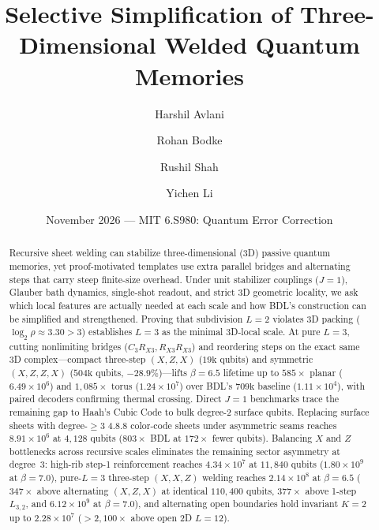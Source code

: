 \documentclass[aps,prx,reprint,superscriptaddress,nofootinbib,floatfix]{revtex4-2}
\begin{document}
\title{Selective Simplification of Three-Dimensional Welded Quantum Memories}

\author{Harshil Avlani}
\author{Rohan Bodke}
\author{Rushil Shah}
\author{Yichen Li}

\date{November 2026 --- MIT 6.S980: Quantum Error Correction}

\begin{abstract}
Recursive sheet welding can stabilize three-dimensional (3D) passive quantum memories, yet proof-motivated templates use extra parallel bridges and alternating steps that carry steep finite-size overhead. Under unit stabilizer couplings ($J = 1$), Glauber bath dynamics, single-shot readout, and strict 3D geometric locality, we ask which local features are actually needed at each scale and how BDL's construction can be simplified and strengthened. Proving that subdivision $L = 2$ violates 3D packing ($\log_2 \rho \approx 3.30 > 3$) establishes $L = 3$ as the minimal 3D-local scale. At pure $L = 3$, cutting nonlimiting bridges ($C_3 R_{X3}, R_{X3} R_{X3}$) and reordering steps on the exact same 3D complex---compact three-step $(X, Z, X)$ ($19\mathrm{k}$ qubits) and symmetric $(X, Z, Z, X)$ ($504\mathrm{k}$ qubits, $-28.9\%$)---lifts $\beta = 6.5$ lifetime up to $585\times$ planar ($6.49 \times 10^6$) and $1{,}085\times$ torus ($1.24 \times 10^7$) over BDL's $709\mathrm{k}$ baseline ($1.11 \times 10^4$), with paired decoders confirming thermal crossing. Direct $J = 1$ benchmarks trace the remaining gap to Haah's Cubic Code to bulk degree-$2$ surface qubits. Replacing surface sheets with degree-$\ge 3$ 4.8.8 color-code sheets under asymmetric seams reaches $8.91 \times 10^6$ at $4{,}128$ qubits ($803\times$ BDL at $172\times$ fewer qubits). Balancing $X$ and $Z$ bottlenecks across recursive scales eliminates the remaining sector asymmetry at degree~$3$: high-rib step-1 reinforcement reaches $4.34 \times 10^7$ at $11{,}840$ qubits ($1.80 \times 10^9$ at $\beta = 7.0$), pure-$L = 3$ three-step $(X, X, Z)$ welding reaches $2.14 \times 10^8$ at $\beta = 6.5$ ($347\times$ above alternating $(X, Z, X)$ at identical $110{,}400$ qubits, $377\times$ above 1-step $L_{3,2}$, and $6.12 \times 10^9$ at $\beta = 7.0$), and alternating open boundaries hold invariant $K = 2$ up to $2.28 \times 10^7$ ($>2{,}100\times$ above open 2D $L = 12$).
\end{abstract}
\end{document}
